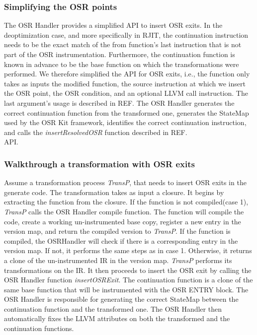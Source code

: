 \subsubsection{Simplifying the OSR points}
The OSR Handler provides a simplified API to insert OSR exits.
In the deoptimization case, and more specifically in RJIT, the continuation instruction needs to be the exact match of the from function's last instruction that is not part of the OSR instrumentation.
Furthermore, the continuation function is known in advance to be the base function on which the transformations were performed.
We therefore simplified the API for OSR exits, i.e., the function only takes as inputs the modified function, the source instruction at which we insert the OSR point, the OSR condition, and an optional LLVM call instruction.
The last argument's usage is described in REF.
The OSR Handler generates the correct continuation function from the transformed one, generates the StateMap used by the OSR Kit framework, identifies the correct continuation instruction, and calls the \textit{insertResolvedOSR} function described in REF.\\

API.\\

\subsubsection{Walkthrough a transformation with OSR exits}
Assume a transformation process \textit{TransP}, that needs to insert OSR exits in the generate code.
The transformation takes as input a closure.
It begins by extracting the function from the closure. 
If the function is not compiled(case 1), \textit{TransP} calls the OSR Handler compile function.
The function will compile the code, create a working un-instrumented base copy, register a new entry in the version map, and return the compiled version to \textit{TransP}.
If the function is compiled, the OSRHandler will check if there is a corresponding entry in the version map. 
If not, it performs the same steps as in case 1.
Otherwise, it returns a clone of the un-instrumented IR in the version map.
\textit{TransP} performs its transformations on the IR.
It then proceeds to insert the OSR exit by calling the OSR Handler function \textit{insertOSRExit}.
The continuation function is a clone of the same base function that will be instrumented with the OSR ENTRY block.
The OSR Handler is responsible for generating the correct StateMap between the continuation function and the transformed one.
The OSR Handler then automatically fixes the LLVM attributes on both the transformed and the continuation functions.\\

